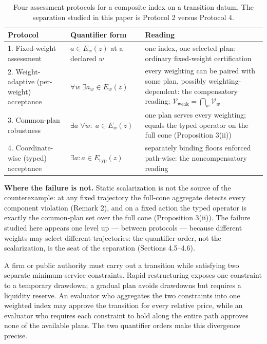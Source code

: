 \documentclass[3p,11pt]{elsarticle}
\begin{document}
\begin{table}[htbp]
\centering
\small
\caption{Four assessment protocols for a composite index on a transition
datum. The separation studied in this paper is Protocol 2 versus Protocol
4.}
\label{tab:protocols}
\begin{tabular}{@{}p{3.9cm}p{3.4cm}p{6.1cm}@{}}
\toprule
Protocol & Quantifier form & Reading \\
\midrule
1. Fixed-weight assessment & \(a \in E_w(z)\) at a declared \(w\) & one index, one selected plan: ordinary fixed-weight certification \\
2. Weight-adaptive (per-weight) acceptance & \(\forall w\; \exists a_w \in E_w(z)\) & every weighting can be paired with some plan, possibly weighting-dependent: the compensatory reading; \(\mathcal{V}_{\mathrm{weak}} = \bigcap_w \mathcal{V}_w\) \\
3. Common-plan robustness & \(\exists a\; \forall w:\; a \in E_w(z)\) & one plan serves every weighting; equals the typed operator on the full cone (Proposition 3(ii)) \\
4. Coordinate-wise (typed) acceptance & \(\exists a: a \in E_{\mathrm{typ}}(z)\) & separately binding floors enforced path-wise: the noncompensatory reading \\
\bottomrule
\end{tabular}
\end{table}

\medskip

\noindent\textbf{Where the failure is not.} Static scalarization is not the
source of the counterexample: at any fixed trajectory the full-cone
aggregate detects every component violation (Remark 2), and on a fixed
action the typed operator is exactly the common-plan set over the full
cone (Proposition 3(ii)). The failure studied here appears one level up
--- between protocols --- because different weights may select different
trajectories: the quantifier order, not the scalarization, is the seat of
the separation (Sections 4.5--4.6).



A firm or public authority must carry out a transition while satisfying
two separate minimum-service constraints. Rapid restructuring exposes one
constraint to a temporary drawdown; a gradual plan avoids drawdowns but
requires a liquidity reserve. An evaluator who aggregates the two
constraints into one weighted index may approve the transition for every
relative price, while an evaluator who requires each constraint to hold
along the entire path approves none of the available plans. The
two quantifier orders make this divergence precise.
\end{document}
